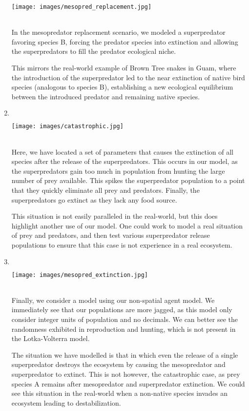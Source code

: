 \documentclass{article}
\begin{document}
\begin{enumerate}
    \centerline{\texttt{[image: images/mesopred\_replacement.jpg]}}\\
    In the mesopredator replacement scenario, we modeled a superpredator favoring species B, forcing the predator species into extinction and allowing the superpredators to fill the predator ecological niche.\par
    This mirrors the real-world example of Brown Tree snakes in Guam, where the introduction of the superpredator led to the near extinction of native bird species (analogous to species B), establishing a new ecological equilibrium between the introduced predator and remaining native species. \cite{ecology_of_fear}
    \item${}$\\
    \centerline{\texttt{[image: images/catastrophic.jpg]}}\\
    Here, we have located a set of parameters that causes the extinction of all species after the release of the superpredators. This occurs in our model, as the superpredators gain too much in population from hunting the large number of prey available. This spikes the superpredator population to a point that they quickly eliminate all prey and predators. Finally, the superpredators go extinct as they lack any food source.\par
    This situation is not easily paralleled in the real-world, but this does highlight another use of our model. One could work to model a real situation of prey and predators, and then test various superpredator release populations to ensure that this case is not experience in a real ecosystem.
    \item${}$\\
    \centerline{\texttt{[image: images/mesopred\_extinction.jpg]}}\\
    Finally, we consider a model using our non-spatial agent model. We immediately see that our populations are more jagged, as this model only consider integer units of population and no decimals. We can better see the randomness exhibited in reproduction and hunting, which is not present in the Lotka-Volterra model.\par
    The situation we have modelled is that in which even the release of a single superpredator destroys the ecosystem by causing the mesopredator and superpredator to extinct. This is not however, the catastrophic case, as prey species A remains after mesopredator and superpredator extinction. We could see this situation in the real-world when a non-native species invades an ecosystem leading to destabilization.
\end{enumerate}
\end{document}
